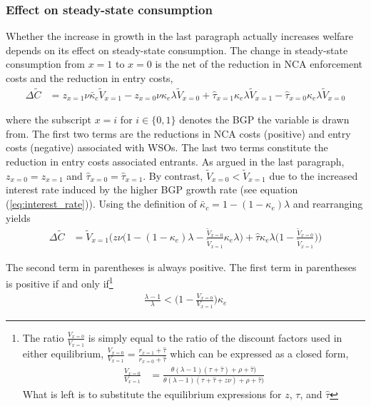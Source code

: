 \documentclass[11pt,english]{article}
\begin{document}
\subsubsection{Effect on steady-state consumption}

Whether the increase in growth in the last paragraph actually increases welfare depends on its effect on steady-state consumption. The change in steady-state consumption from $x = 1$ to $x = 0$ is the net of the reduction in NCA enforcement costs and the reduction in entry costs,
\begin{align}
	\Delta \tilde{C} &= z_{x = 1} \nu \bar{\kappa}_c  \tilde{V}_{x = 1} - z_{x = 0} \nu \kappa_e \lambda \tilde{V}_{x = 0} + \hat{\tau}_{x = 1} \kappa_e \lambda \tilde{V}_{x=1} - \hat{\tau}_{x = 0} \kappa_e \lambda \tilde{V}_{x =0}
\end{align}

where the subscript $x = i$ for $i \in \{0,1\}$ denotes the BGP the variable is drawn from. The first two terms are the reductions in NCA costs (positive) and entry costs (negative) associated with WSOs. The last two terms constitute the reduction in entry costs associated entrants. As argued in the last paragraph, $z_{x = 0} = z_{x=1}$ and $\hat{\tau}_{x = 0} = \hat{\tau}_{x = 1}$. By contrast, $\tilde{V}_{x=0} < \tilde{V}_{x=1}$ due to the increased interest rate induced by the higher BGP growth rate (see equation (\ref{eq:interest_rate})). Using the definition of $\bar{\kappa}_c = 1 - (1-\kappa_e) \lambda$ and rearranging yields
\begin{align}
\Delta \tilde{C} &= \tilde{V}_{x = 1} \Bigg( z \nu \Big( 1 - (1-\kappa_e)\lambda - \frac{\tilde{V}_{x = 0}}{\tilde{V}_{x = 1}}\kappa_e \lambda \Big) + \hat{\tau} \kappa_e \lambda \Big( 1 - \frac{\tilde{V}_{x = 0}}{\tilde{V}_{x = 1}}\Big) \Bigg) \label{eq:misallocation_NCA_consumption}
\end{align}

The second term in parentheses is always positive. The first term in parentheses is positive if and only if\footnote{The ratio $\frac{V_{x = 0}}{V_{x = 1}}$ is simply equal to the ratio of the discount factors used in either equilibrium, $\frac{V_{x = 0}}{V_{x = 1}} = \frac{r_{x = 1} + \hat{\tau}}{r_{x = 0} + \hat{\tau}}$ which can be expressed as a closed form,
	\begin{align*}
	\frac{V_{x = 0}}{V_{x = 1}} &= \frac{\theta(\lambda - 1) (\tau+ \hat{\tau}) + \rho + \hat{\tau})}{\theta(\lambda - 1) (\tau+ \hat{\tau} + z\nu )  + \rho + \hat{\tau})}
	\end{align*} 
	What is left is to substitute the equilibrium expressions for $z$, $\tau$, and $\hat{\tau}$}
\begin{align}
	\frac{\lambda -1}{\lambda} < \big( 1 - \frac{V_{x = 0}}{V_{x = 1}} \big) \kappa_e  \label{cs:consumption_decreasing_condition}
\end{align}
\end{document}
